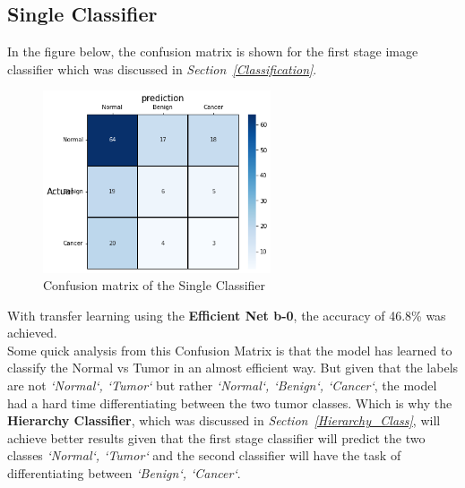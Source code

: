 \documentclass[12pt]{extarticle}
\begin{document}
	\subsection{Single Classifier}
	In the figure below, the confusion matrix is shown for the first stage image classifier which was discussed in \emph{Section~\ref{Classification}}.
	\begin{figure}[h]
		\centering
		\includegraphics[width=0.6\textwidth]{pics/Figures/1st_stage_conf_matrix.png}
		\caption{\small{Confusion matrix of the Single Classifier}}
		\label{fig:conf-mat-single}
	\end{figure}
	With transfer learning using the \textbf{Efficient Net b-0}, the accuracy of 46.8\% was achieved.\\
	Some quick analysis from this Confusion Matrix is that the model has learned to classify the Normal vs Tumor in an almost efficient way. But given that the labels are not \emph{`Normal`, `Tumor`} but rather \emph{`Normal`, `Benign`, `Cancer`}, the model had a hard time differentiating between the two tumor classes. Which is why the \textbf{Hierarchy Classifier}, which was discussed in \emph{Section~\ref{Hierarchy_Class}}, will achieve better results given that the first stage classifier will predict the two classes \emph{`Normal`, `Tumor`} and the second classifier will have the task of differentiating between \emph{`Benign`, `Cancer`}.
	
\end{document}
